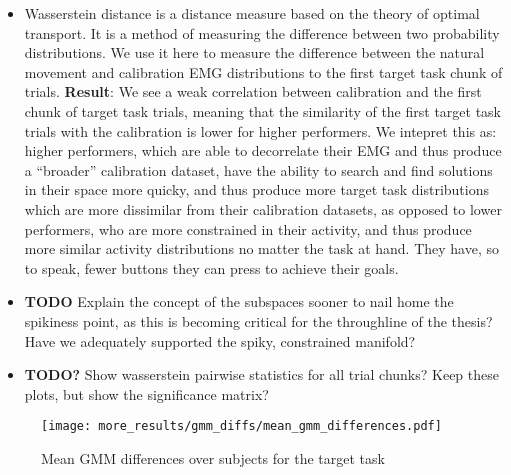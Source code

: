 \documentclass[../main.tex]{subfiles}
\begin{document}
\begin{itemize}
  \item Wasserstein distance is a distance measure based on the theory of optimal transport. It is a method of measuring the difference between two probability distributions. We use it here to measure the difference between the natural movement and calibration EMG distributions to the first target task chunk of trials. \textbf{Result}: We see a weak correlation between calibration and the first chunk of target task trials, meaning that the similarity of the first target task trials with the calibration is lower for higher performers. We intepret this as: higher performers, which are able to decorrelate their EMG and thus produce a ``broader'' calibration dataset, have the ability to search and find solutions in their space more quicky, and thus produce more target task distributions which are more dissimilar from their calibration datasets, as opposed to lower performers, who are more constrained in their activity, and thus produce more similar activity distributions no matter the task at hand. They have, so to speak, fewer buttons they can press to achieve their goals.
  \item \textbf{TODO} Explain the concept of the subspaces sooner to nail home the spikiness point, as this is becoming critical for the throughline of the thesis? Have we adequately supported the spiky, constrained manifold?
  \item \textbf{TODO?} Show wasserstein pairwise statistics for all trial chunks? Keep these plots, but show the significance matrix?
\end{itemize}


\begin{figure}[H]%
  \centering
    \texttt{[image: more\_results/gmm\_diffs/mean\_gmm\_differences.pdf]}
    \caption[Mean GMM differences over subjects for the target task]{Mean GMM differences over subjects for the target task}\label{fig:gmm_diffs}
\end{figure}
\end{document}
